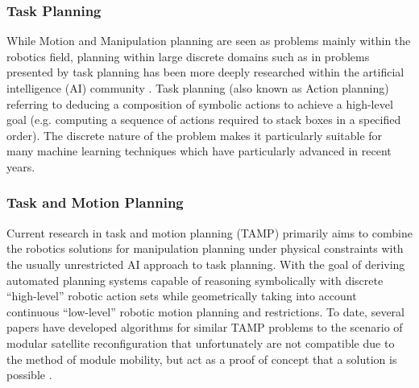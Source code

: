 \subsubsection{Task Planning}
While Motion and Manipulation planning are seen as problems mainly within the robotics field, planning within large discrete domains such as in problems presented by task planning has been more deeply researched within the artificial intelligence (AI) community \cite{ghallab2004automated}. Task planning (also known as Action planning) referring to deducing a composition of symbolic actions to achieve a high-level goal (e.g. computing a sequence of actions required to stack boxes in a specified order). The discrete nature of the problem makes it particularly suitable for many machine learning techniques which have particularly advanced in recent years.
\pagebreak
\subsubsection{Task and Motion Planning}
Current research in task and motion planning (TAMP) primarily aims to combine the robotics solutions for manipulation planning under physical constraints with the usually unrestricted AI approach to task planning. With the goal of deriving automated planning systems capable of reasoning symbolically with discrete “high-level” robotic action sets while geometrically taking into account continuous “low-level” robotic motion planning and restrictions. To date, several papers have developed algorithms for similar TAMP problems to the scenario of modular satellite reconfiguration that unfortunately are not compatible due to the method of module mobility, but act as a proof of concept that a solution is possible \cite{1013348, 8206101, 7091046}.

